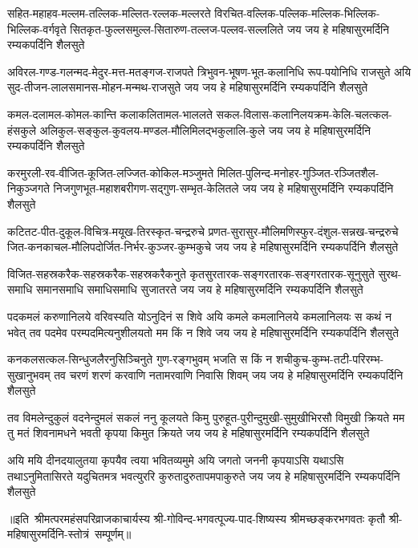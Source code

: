 \fourlineindentedshloka
{सहित-महाहव-मल्लम-तल्लिक-मल्लित-रल्लक-मल्लरते}
{विरचित-वल्लिक-पल्लिक-मल्लिक-भिल्लिक-भिल्लिक-वर्गवृते}
{सितकृत-फुल्लसमुल्ल-सितारुण-तल्लज-पल्लव-सल्ललिते}
{जय जय हे महिषासुरमर्दिनि रम्यकपर्दिनि शैलसुते}

\fourlineindentedshloka
{अविरल-गण्ड-गलन्मद-मेदुर-मत्त-मतङ्गज-राजपते}
{त्रिभुवन-भूषण-भूत-कलानिधि रूप-पयोनिधि राजसुते}
{अयि सुद-तीजन-लालसमानस-मोहन-मन्मथ-राजसुते}
{जय जय हे महिषासुरमर्दिनि रम्यकपर्दिनि शैलसुते}

\fourlineindentedshloka
{कमल-दलामल-कोमल-कान्ति कलाकलितामल-भाललते}
{सकल-विलास-कलानिलयक्रम-केलि-चलत्कल-हंसकुले}
{अलिकुल-सङ्कुल-कुवलय-मण्डल-मौलिमिलद्भकुलालि-कुले}
{जय जय हे महिषासुरमर्दिनि रम्यकपर्दिनि शैलसुते}

\fourlineindentedshloka
{करमुरली-रव-वीजित-कूजित-लज्जित-कोकिल-मञ्जुमते}
{मिलित-पुलिन्द-मनोहर-गुञ्जित-रञ्जितशैल-निकुञ्जगते}
{निजगुणभूत-महाशबरीगण-सद्गुण-सम्भृत-केलितले}
{जय जय हे महिषासुरमर्दिनि रम्यकपर्दिनि शैलसुते}

\fourlineindentedshloka
{कटितट-पीत-दुकूल-विचित्र-मयूख-तिरस्कृत-चन्द्ररुचे}
{प्रणत-सुरासुर-मौलिमणिस्फुर-दंशुल-सन्नख-चन्द्ररुचे}
{जित-कनकाचल-मौलिपदोर्जित-निर्भर-कुञ्जर-कुम्भकुचे}
{जय जय हे महिषासुरमर्दिनि रम्यकपर्दिनि शैलसुते}

\fourlineindentedshloka
{विजित-सहस्रकरैक-सहस्रकरैक-सहस्रकरैकनुते}
{कृतसुरतारक-सङ्गरतारक-सङ्गरतारक-सूनुसुते}
{सुरथ-समाधि समानसमाधि समाधिसमाधि सुजातरते}
{जय जय हे महिषासुरमर्दिनि रम्यकपर्दिनि शैलसुते}

\fourlineindentedshloka
{पदकमलं करुणानिलये वरिवस्यति योऽनुदिनं स शिवे}
{अयि कमले कमलानिलये कमलानिलयः स कथं न भवेत्}
{तव पदमेव परम्पदमित्यनुशीलयतो मम किं न शिवे}
{जय जय हे महिषासुरमर्दिनि रम्यकपर्दिनि शैलसुते}

\fourlineindentedshloka
{कनकलसत्कल-सिन्धुजलैरनुसिञ्चिनुते गुण-रङ्गभुवम्}
{भजति स किं न शचीकुच-कुम्भ-तटी-परिरम्भ-सुखानुभवम्}
{तव चरणं शरणं करवाणि नतामरवाणि निवासि शिवम्}
{जय जय हे महिषासुरमर्दिनि रम्यकपर्दिनि शैलसुते}

\fourlineindentedshloka
{तव विमलेन्दुकुलं वदनेन्दुमलं सकलं ननु कूलयते}
{किमु पुरुहूत-पुरीन्दुमुखी-सुमुखीभिरसौ विमुखी क्रियते}
{मम तु मतं शिवनामधने भवती कृपया किमुत क्रियते}
{जय जय हे महिषासुरमर्दिनि रम्यकपर्दिनि शैलसुते}

\fourlineindentedshloka
{अयि मयि दीनदयालुतया कृपयैव त्वया भवितव्यमुमे}
{अयि जगतो जननी कृपयाऽसि यथाऽसि तथाऽनुमितासिरते}
{यदुचितमत्र भवत्युररि कुरुतादुरुतापमपाकुरुते}
{जय जय हे महिषासुरमर्दिनि रम्यकपर्दिनि शैलसुते}

॥इति~श्रीमत्परमहंसपरिव्राजकाचार्यस्य श्री-गोविन्द-भगवत्पूज्य-पाद-शिष्यस्य
श्रीमच्छङ्करभगवतः कृतौ  श्री-महिषासुरमर्दिनि-स्तोत्रं~सम्पूर्णम्॥
\setlength{\shlokaspaceskip}{24pt}